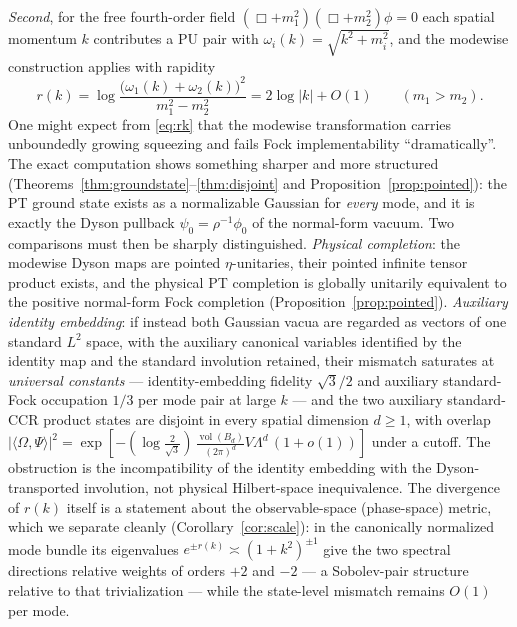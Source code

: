 \documentclass[11pt]{article}
\theoremstyle{definition}
\theoremstyle{remark}
\newcommand{\w}{\omega}
\begin{document}
\emph{Second}, for the free fourth-order field
$(\Box+m_1^2)(\Box+m_2^2)\phi=0$ each spatial momentum $k$ contributes a PU
pair with $\w_i(k)=\sqrt{k^2+m_i^2}$, and the modewise construction
applies with rapidity
\begin{equation}\label{eq:rk}
r(k)=\log\frac{\big(\w_1(k)+\w_2(k)\big)^2}{m_1^2-m_2^2}
=2\log|k|+O(1)\qquad(m_1>m_2).
\end{equation}
One might expect from \eqref{eq:rk} that the modewise transformation carries
unboundedly growing squeezing and fails Fock implementability
``dramatically''.  The exact computation shows something sharper and more
structured (Theorems~\ref{thm:groundstate}--\ref{thm:disjoint} and
Proposition~\ref{prop:pointed}): the PT
ground state exists as a normalizable Gaussian for \emph{every} mode, and
it is exactly the Dyson pullback $\psi_0=\rho^{-1}\phi_0$ of the
normal-form vacuum.  Two comparisons must then be sharply distinguished.
\emph{Physical completion}: the modewise Dyson maps are pointed
$\eta$-unitaries, their pointed infinite tensor product exists, and the
physical PT completion is globally unitarily equivalent to the positive
normal-form Fock completion (Proposition~\ref{prop:pointed}).
\emph{Auxiliary identity embedding}: if instead both Gaussian vacua are
regarded as vectors of one standard $L^2$ space, with the auxiliary
canonical variables identified by the identity map and the standard
involution retained, their mismatch saturates at \emph{universal
constants} --- identity-embedding fidelity $\sqrt3/2$ and auxiliary
standard-Fock occupation $1/3$ per mode pair at large $k$ --- and the two
auxiliary standard-CCR product states are disjoint in every spatial
dimension $d\ge1$, with overlap
$|\langle\Omega,\Psi\rangle|^2
=\exp[-(\log\tfrac{2}{\sqrt3})\,
\tfrac{\operatorname{vol}(B_d)}{(2\pi)^d}V\Lambda^d\,(1+o(1))]$ under a
cutoff.  The obstruction is the incompatibility of the identity embedding
with the Dyson-transported involution, not physical Hilbert-space
inequivalence.  The divergence of $r(k)$ itself is
a statement about the observable-space (phase-space) metric, which we
separate cleanly (Corollary~\ref{cor:scale}): in the canonically
normalized mode bundle its eigenvalues
$e^{\pm r(k)}\asymp(1+k^2)^{\pm1}$ give the two spectral directions
relative weights of orders $+2$ and $-2$ --- a Sobolev-pair structure
relative to that trivialization --- while the state-level mismatch
remains $O(1)$ per mode.
\end{document}
